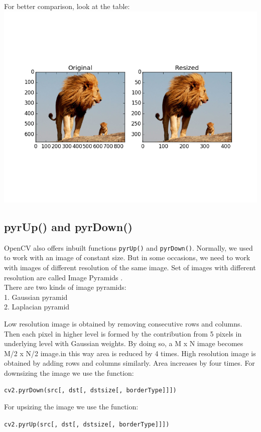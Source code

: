 \documentclass[]{article}
\begin{document}
For better comparison, look at the table:
\centering
\includegraphics{resizecomp.png}

\subsection{pyrUp() and pyrDown()}\label{pyrup-and-pyrdown}

OpenCV also offers inbuilt functions \texttt{pyrUp()} and
\texttt{pyrDown()}. Normally, we used to work with an image of constant
size. But in some occasions, we need to work with images of different
resolution of the same image. Set of images with different resolution
are called Image Pyramids .\\
There are two kinds of image pyramids:\\
1. Gaussian pyramid\\
2. Laplacian pyramid

Low resolution image is obtained by removing consecutive rows and
columns. Then each pixel in higher level is formed by the contribution
from 5 pixels in underlying level with Gaussian weights. By doing so, a
M x N image becomes M/2 x N/2 image.in this way area is reduced by 4
times. High resolution image is obtained by adding rows and columns
similarly. Area increases by four times. For downsizing the image we use
the function:

\texttt{cv2.pyrDown(src{[},\ dst{[},\ dstsize{[},\ borderType{]}{]}{]})}

For upsizing the image we use the function:

\texttt{cv2.pyrUp(src{[},\ dst{[},\ dstsize{[},\ borderType{]}{]}{]})}
\end{document}
